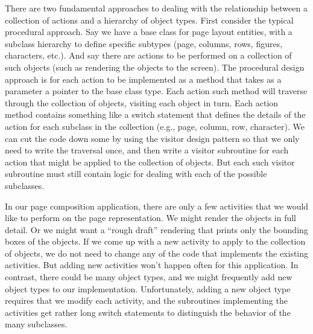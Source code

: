 There are two fundamental approaches to dealing with the relationship
between a collection of actions and a hierarchy of object types.
First consider the typical procedural approach.
Say we have a base class for page layout entities, with a subclass
hierarchy to define specific subtypes (page, columns, rows, figures,
characters, etc.).
And say there are actions to be performed on a collection of such
objects (such as rendering the objects to the screen).
The procedural design approach is for each action to be implemented
as a method that takes as a parameter a pointer to the base class
type.
Each action such method will traverse through the collection of
objects, visiting each object in turn.
Each action method contains something like a switch statement that
defines the details of the action for each subclass in the collection
(e.g., page, column, row, character).
We can cut the code down some by using the
visitor design pattern
so that we only need to write the traversal once, and then write a
visitor subroutine for each action that might be applied to the
collection of objects.
But each such visitor subroutine must still contain logic for dealing
with each of the possible subclasses.

In our page composition application, there are only a few activities
that we would like to perform on the page representation.
We might render the objects in full detail.
Or we might want a ``rough draft'' rendering that prints only the
bounding boxes of the objects.
If we come up with a new activity to apply to the collection of
objects, we do not need to change any of the code that implements the
existing activities.
But adding new activities won't happen often for this application.
In contrast, there could be many object types, and we might frequently
add new object types to our implementation.
Unfortunately, adding a new object type requires that we modify each
activity, and the subroutines implementing the activities get rather
long switch statements to distinguish the behavior of the many
subclasses.

